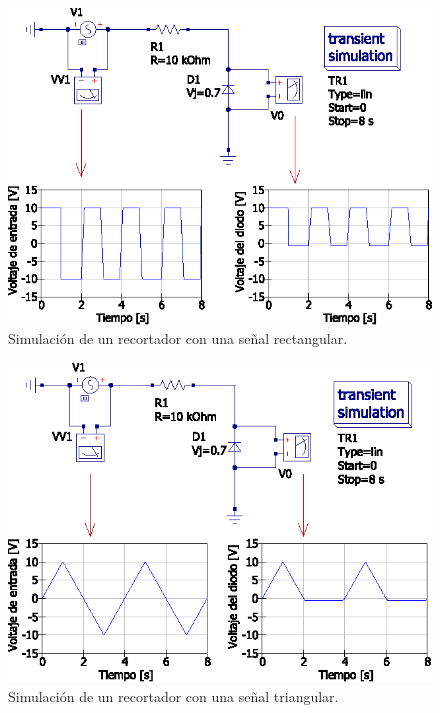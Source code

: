 \documentclass[letter,twoside,11pt]{article}
\begin{document}
{\begin{figure}[!h]
\centering
\includegraphics[scale=1.00]{simulacion/practica1.2.eps}
\caption{Simulación de un recortador con una señal rectangular.}
\label{simulacion2}
\end{figure}

\begin{figure}[!h]
\centering
\includegraphics[scale=1.00]{simulacion/practica1.3.eps}
\caption{Simulación de un recortador con una señal triangular.}
\label{simulacion3}
\end{figure}

}
\end{document}
